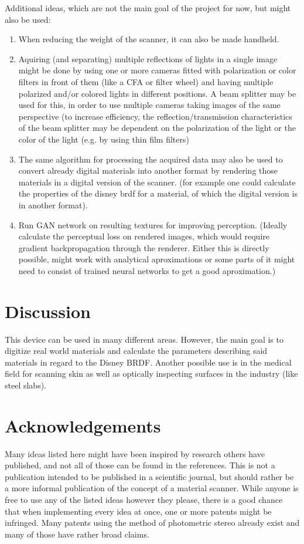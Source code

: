\documentclass[11pt, twoside, listof=totocnumbered, bibliography=totocnumbered]{scrartcl}
\begin{document}
Additional ideas, which are not the main goal of the project for now, but might also be used:
\begin{enumerate}
	\item When reducing the weight of the scanner, it can also be made handheld.
	\item Aquiring (and separating) multiple reflections of lights in a single image might be done by using one or more cameras fitted with polarization or color filters in front of them (like a CFA or filter wheel) and having multiple polarized and/or colored lights in different positions. A beam splitter may be used for this, in order to use multiple cameras taking images of the same perspective (to increase efficiency, the reflection/transmission characteristics of the beam splitter may be dependent on the polarization of the light or the color of the light (e.g. by using thin film filters)
	\item The same algorithm for processing the acquired data may also be used to convert already digital materials into another format by rendering those materials in a digital version of the scanner. (for example one could calculate the properties of the disney brdf for a material, of which the digital version is in another format).
	\item Run GAN network on resulting textures for improving perception. (Ideally calculate the perceptual loss on rendered images, which would require gradient backpropagation through the renderer. Either this is directly possible, might work with analytical aproximations or some parts of it might need to consist of trained neural networks to get a good aproximation.)
\end{enumerate}

\section{Discussion}
This device can be used in many different areas. However, the main goal is to digitize real world materials and calculate the parameters describing said materials in regard to the Disney BRDF. \cite{DISNEY_BRDF}
Another possible use is in the medical field for scanning skin as well as optically inspecting surfaces in the industry (like steel slabs).
\section{Acknowledgements}
Many ideas listed here might have been inspired by research others have published, and not all of those can be found in the references. This is not a publication intended to be published in a scientific journal, but should rather be a more informal publication of the concept of a material scanner. While anyone is free to use any of the listed ideas however they please, there is a good chance that when implementing every idea at once, one or more patents might be infringed. Many patents using the method of photometric stereo already exist and many of those have rather broad claims.
\newpage
\end{document}
